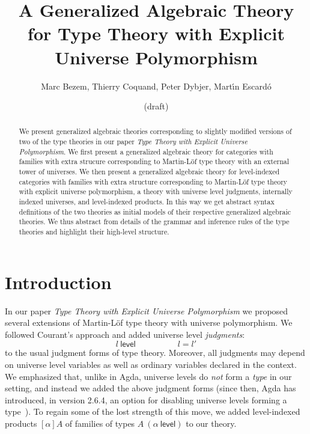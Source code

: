 \documentclass[11pt,a4paper]{article}
\theoremstyle{plain}
\theoremstyle{definition}
\newcommand{\level}{\mathsf{level}}
\begin{document}
\title{A Generalized Algebraic Theory\\ for Type Theory
with Explicit Universe Polymorphism
}

\author{Marc Bezem, Thierry Coquand, Peter Dybjer, Mart\'{\i}n Escard\'o}

\date{(draft)}
\maketitle

\begin{abstract}
We present generalized algebraic theories corresponding to slightly modified versions of two of the type theories in our paper
{\em Type Theory with Explicit Universe Polymorphism}. We first present a generalized algebraic theory for categories with families with extra strucure corresponding to Martin-Löf type theory with an external tower of universes. We then present a generalized algebraic theory for level-indexed categories with families with extra structure corresponding to Martin-Löf type theory with explicit universe polymorphism, a theory with universe level judgments, internally indexed universes, and level-indexed products. In this way we get abstract syntax definitions of the two theories as initial models of their respective generalized algebraic theories. We thus abstract from details of the grammar and inference rules of the type theories and highlight their high-level structure. 
\end{abstract}

\section{Introduction}

In our paper {\em Type Theory with Explicit Universe Polymorphism} \cite{BezemCDE22} we proposed several extensions of Martin-Löf type theory with universe polymorphism. We followed Courant's approach \cite{Courant02} and added universe level {\em judgments}:
$$
l\ \level
\hspace{5em}
l = l'
$$
to the usual judgment forms of type theory. Moreover, all judgments may depend on universe level variables as well as ordinary variables declared in the context. We emphasized that, unlike in Agda, universe levels do {\em not} form a {\em type} in our setting, and instead we added the above judgment forms (since then, Agda has introduced, in version 2.6.4, an option for disabling universe levels forming a type~\cite{agda:leveluniv}).  To regain some of the lost strength of this move, we added level-indexed products $[\alpha]A$ of families of types $A\ (\alpha\ \level)$ to our theory.
\end{document}
